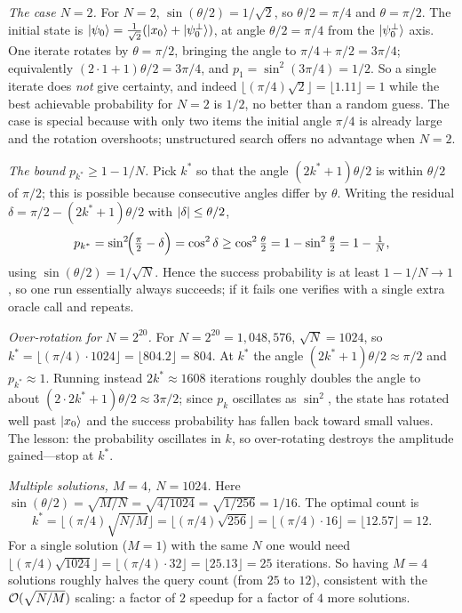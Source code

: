 \begin{solution}
\emph{The case $N=2$.} For $N=2$, $\sin(\theta/2)=1/\sqrt2$, so $\theta/2=\pi/4$ and
$\theta=\pi/2$. The initial state is
$\ket{\psi_0}=\tfrac1{\sqrt2}(\ket{x_0}+\ket{\psi_0^{\perp}})$, at angle
$\theta/2=\pi/4$ from the $\ket{\psi_0^{\perp}}$ axis. One iterate rotates by
$\theta=\pi/2$, bringing the angle to $\pi/4+\pi/2=3\pi/4$; equivalently
$(2\cdot1+1)\theta/2=3\pi/4$, and $p_1=\sin^2(3\pi/4)=1/2$. So a single iterate does
\emph{not} give certainty, and indeed
$\lfloor(\pi/4)\sqrt2\rfloor=\lfloor1.11\rfloor=1$ while the best achievable
probability for $N=2$ is $1/2$, no better than a random guess. The case is special
because with only two items the initial angle $\pi/4$ is already large and the
rotation overshoots; unstructured search offers no advantage when $N=2$.

\emph{The bound $p_{k^{\ast}}\ge1-1/N$.} Pick $k^{\ast}$ so that the angle
$(2k^{\ast}+1)\theta/2$ is within $\theta/2$ of $\pi/2$; this is possible because
consecutive angles differ by $\theta$. Writing the residual
$\delta=\pi/2-(2k^{\ast}+1)\theta/2$ with $\left\lvert \delta \right\rvert\le\theta/2$,
\[
  p_{k^{\ast}}=\sin^2\!\Bigl(\tfrac\pi2-\delta\Bigr)=\cos^2\delta\ge\cos^2\tfrac\theta2
   =1-\sin^2\tfrac\theta2=1-\tfrac1N,
\]
using $\sin(\theta/2)=1/\sqrt N$. Hence the success probability is at least
$1-1/N\to1$, so one run essentially always succeeds; if it fails one verifies with a
single extra oracle call and repeats.
\end{solution}

\begin{solution}
\emph{Over-rotation for $N=2^{20}$.} For $N=2^{20}=1{,}048{,}576$, $\sqrt N=1024$, so
$k^{\ast}=\lfloor(\pi/4)\cdot1024\rfloor=\lfloor804.2\rfloor=804$. At $k^{\ast}$ the
angle $(2k^{\ast}+1)\theta/2\approx\pi/2$ and $p_{k^{\ast}}\approx1$. Running instead
$2k^{\ast}\approx1608$ iterations roughly doubles the angle to about
$(2\cdot2k^{\ast}+1)\theta/2\approx3\pi/2$; since $p_k$ oscillates as $\sin^2$, the
state has rotated well past $\ket{x_0}$ and the success probability has fallen back
toward small values. The lesson: the probability oscillates in $k$, so over-rotating
destroys the amplitude gained---stop at $k^{\ast}$.

\emph{Multiple solutions, $M=4$, $N=1024$.} Here
$\sin(\theta/2)=\sqrt{M/N}=\sqrt{4/1024}=\sqrt{1/256}=1/16$. The optimal count is
\[
  k^{\ast}=\lfloor(\pi/4)\sqrt{N/M}\rfloor=\lfloor(\pi/4)\sqrt{256}\rfloor
   =\lfloor(\pi/4)\cdot16\rfloor=\lfloor12.57\rfloor=12.
\]
For a single solution ($M=1$) with the same $N$ one would need
$\lfloor(\pi/4)\sqrt{1024}\rfloor=\lfloor(\pi/4)\cdot32\rfloor=\lfloor25.13\rfloor=25$
iterations. So having $M=4$ solutions roughly halves the query count (from $25$ to
$12$), consistent with the $\mathcal{O}(\sqrt{N/M})$ scaling: a factor of $2$ speedup for a
factor of $4$ more solutions.
\end{solution}

